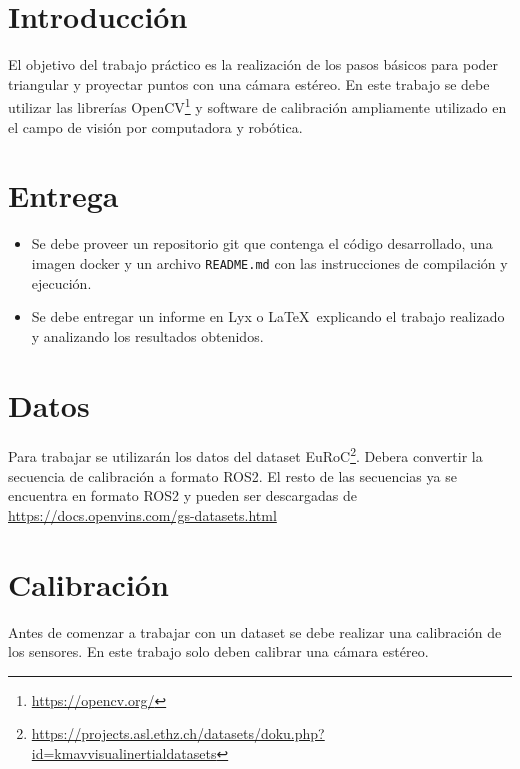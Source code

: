 \documentclass[tp]{lcc}
\begin{document}
\maketitle

\section{Introducción}

El objetivo del trabajo práctico es la realización de los pasos básicos para poder triangular y proyectar puntos con una cámara estéreo. En este trabajo se debe utilizar  las librerías OpenCV\footnote{\url{https://opencv.org/}} y software de calibración ampliamente utilizado en el campo de visión por computadora y robótica.


\section{Entrega}
\begin{itemize}
	\item Se debe proveer un repositorio git que contenga el código desarrollado, una imagen docker y un archivo \lstinline{README.md} con las instrucciones de compilación y ejecución.
    
	\item Se debe entregar un informe en Lyx o \LaTeX\  explicando el trabajo realizado y analizando los resultados obtenidos.
\end{itemize}

\section{Datos}
Para trabajar se utilizarán los datos del dataset EuRoC\footnote{\url{https://projects.asl.ethz.ch/datasets/doku.php?id=kmavvisualinertialdatasets}}. Debera convertir la secuencia de calibración a formato ROS2. El resto de las secuencias ya se encuentra en formato ROS2 y pueden ser descargadas de \url{https://docs.openvins.com/gs-datasets.html}

\section{Calibración}
Antes de comenzar a trabajar con un dataset se debe realizar una calibración de los sensores. En este trabajo solo deben calibrar una cámara estéreo.
\end{document}
